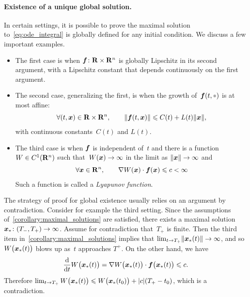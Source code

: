 \paragraph{Existence of a unique global solution.}
In certain settings,
it is possible to prove the maximal solution to~\eqref{eq:ode_integral} is globally defined for any initial condition.
We discuss a few important examples.
\begin{itemize}
    \item
        The first case is when $\mathbf{\boldsymbol{f}}\colon \mathbf R \times \mathbf R^n$ is globally Lipschitz in its second argument,
        with a Lipschitz constant that depends continuously on the first argument.

    \item
        The second case,
        generalizing the first,
        is when the growth of~$\vect f(t, \placeholder)$ is at most affine:
        \[
            \forall (t, \mathbf{\boldsymbol{x}}) \in \mathbf R \times \mathbf R^n, \qquad
            \lVert \mathbf{\boldsymbol{f}}(t, \mathbf{\boldsymbol{x}}) \rVert \leqslant C(t) + L(t) \lVert \mathbf{\boldsymbol{x}} \rVert,
        \]
        with continuous constants~$C(t)$ and $L(t)$.

    \item
        The third case is when $\mathbf{\boldsymbol{f}}$ is independent of~$t$ and there is a function~$W \in C^1(\mathbf R^n)$ such that~$W(\mathbf{\boldsymbol{x}}) \to \infty$ in the limit as $\lVert\mathbf{\boldsymbol{x}}\rVert \to \infty$
        and
        \[
            \forall \mathbf{\boldsymbol{x}} \in \mathbf R^n, \qquad
            \nabla W(\mathbf{\boldsymbol{x}}) \cdot \mathbf{\boldsymbol{f}}(\mathbf{\boldsymbol{x}}) \leqslant c < \infty
        \]
        Such a function is called a \emph{Lyapunov function}.
\end{itemize}
The strategy of proof for global existence usually relies on an argument by contradiction.
Consider for example the third setting.
Since the assumptions of~\cref{corollary:maximal_solutions} are satisfied,
there exists a maximal solution $\mathbf{\boldsymbol{x}}_*\colon (T_-, T_+) \to \infty$.
Assume for contradiction that~$T_+$ is finite.
Then the third item in~\cref{corollary:maximal_solutions} implies that $\lim_{t \to T_+} \lVert\mathbf{\boldsymbol{x}}_*(t)\rVert \to \infty$,
and so~$W\bigl(\mathbf{\boldsymbol{x}}_*(t)\bigr)$ blows up as~$t$ approaches $T^+$.
On the other hand, we have
\[
    \frac{\mathrm d}{\mathrm d t} W\bigl(\mathbf{\boldsymbol{x}}_*(t)\bigr) = \nabla W\bigl(\mathbf{\boldsymbol{x}}_*(t)\bigr) \cdot \mathbf{\boldsymbol{f}}\bigl(\mathbf{\boldsymbol{x}}_*(t)\bigr) \leqslant c.
\]
Therefore $\lim_{t \to T_+} W\bigl(\mathbf{\boldsymbol{x}}_*(t)\bigr) \leqslant W\bigl(\mathbf{\boldsymbol{x}}_*(t_0)\bigr) + \lvert c \rvert (T_+ - t_0)$,
which is a contradiction.

